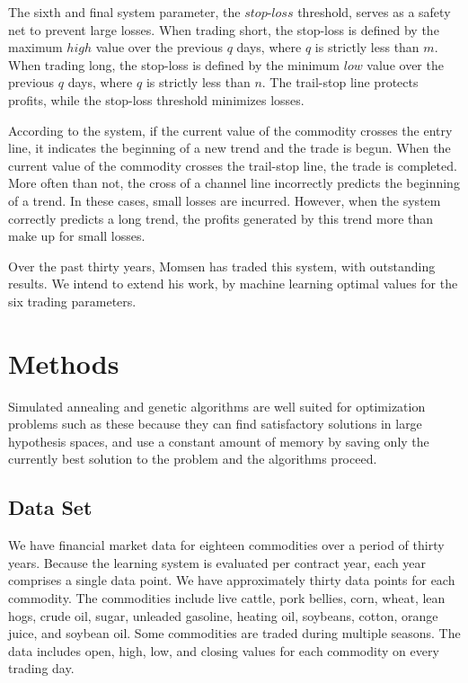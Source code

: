 \documentclass[10pt]{article}
\begin{document}
The sixth and final system parameter, the $stop$-$loss$ threshold, serves as a
safety net to prevent large losses.  When trading short, the stop-loss is
defined by the maximum $high$ value over the previous $q$ days, where $q$ is
strictly less than $m$.  When trading long, the stop-loss is defined by the
minimum $low$ value over the previous $q$ days, where $q$ is strictly less than
$n$.  The trail-stop line protects profits, while the stop-loss threshold
minimizes losses.

According to the system, if the current value of the commodity crosses the entry
line, it indicates the beginning of a new trend and the trade is begun.  When
the current value of the commodity crosses the trail-stop line, the trade is
completed.  More often than not, the cross of a channel line incorrectly
predicts the beginning of a trend.  In these cases, small losses are incurred.
However, when the system correctly predicts a long trend, the profits generated
by this trend more than make up for small losses.

Over the past thirty years, Momsen has traded this system, with outstanding
results.  We intend to extend his work, by machine learning optimal values for
the six trading parameters.

\section{Methods}

Simulated annealing and genetic algorithms are well suited for optimization
problems such as these because they can find satisfactory solutions in large
hypothesis spaces, and use a constant amount of memory by saving only the
currently best solution to the problem and the algorithms proceed.



\subsection{Data Set}

We have financial market data for eighteen commodities over a period of thirty
years.  Because the learning system is evaluated per contract year, each year
comprises a single data point.  We have approximately thirty data points for
each commodity.  The commodities include live cattle, pork bellies, corn, wheat,
lean hogs, crude oil, sugar, unleaded gasoline, heating oil, soybeans, cotton,
orange juice, and soybean oil.  Some commodities are traded during multiple
seasons.  The data includes open, high, low, and closing values for each
commodity on every trading day.
\end{document}
